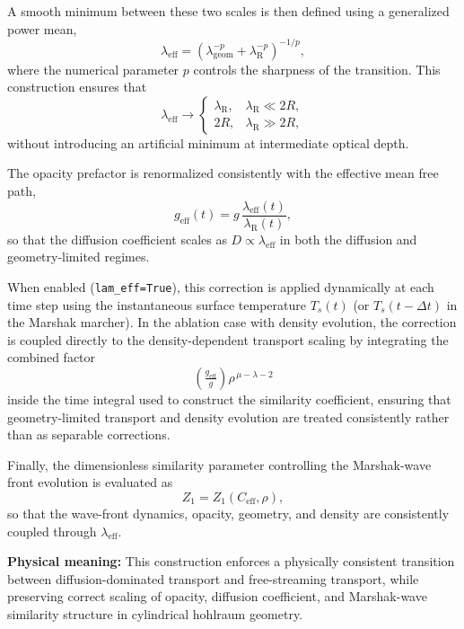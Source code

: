 \documentclass{article}
\begin{document}
A smooth minimum between these two scales is then defined using a generalized power mean,
\begin{equation}
\lambda_{\mathrm{eff}}
=
\left(
\lambda_{\mathrm{geom}}^{-p}
+
\lambda_{\mathrm{R}}^{-p}
\right)^{-1/p},
\end{equation}
where the numerical parameter $p$ controls the sharpness of the transition.  
This construction ensures that
\[
\lambda_{\mathrm{eff}} \to
\begin{cases}
\lambda_{\mathrm{R}}, & \lambda_{\mathrm{R}} \ll 2R,\\
2R, & \lambda_{\mathrm{R}} \gg 2R,
\end{cases}
\]
without introducing an artificial minimum at intermediate optical depth.

The opacity prefactor is renormalized consistently with the effective mean free path,
\begin{equation}
g_{\mathrm{eff}}(t)
=
g\,\frac{\lambda_{\mathrm{eff}}(t)}{\lambda_{\mathrm{R}}(t)},
\end{equation}
so that the diffusion coefficient scales as $D \propto \lambda_{\mathrm{eff}}$ in both the diffusion and geometry-limited regimes.

When enabled (\texttt{lam\_eff=True}), this correction is applied dynamically at each time step using the instantaneous surface temperature $T_s(t)$ (or $T_s(t-\Delta t)$ in the Marshak marcher).  
In the ablation case with density evolution, the correction is coupled directly to the density-dependent transport scaling by integrating the combined factor
\[
\left(\tfrac{g_{\mathrm{eff}}}{g}\right)\rho^{\,\mu-\lambda-2}
\]
inside the time integral used to construct the similarity coefficient, ensuring that geometry-limited transport and density evolution are treated consistently rather than as separable corrections.

Finally, the dimensionless similarity parameter controlling the Marshak-wave front evolution is evaluated as
\begin{equation}
Z_1 = Z_1\!\left(C_{\mathrm{eff}}, \rho\right),
\end{equation}
so that the wave-front dynamics, opacity, geometry, and density are consistently coupled through $\lambda_{\mathrm{eff}}$.

\bigskip
\noindent
\textbf{Physical meaning:}  
This construction enforces a physically consistent transition between diffusion-dominated transport and free-streaming transport, while preserving correct scaling of opacity, diffusion coefficient, and Marshak-wave similarity structure in cylindrical hohlraum geometry.
\end{document}
